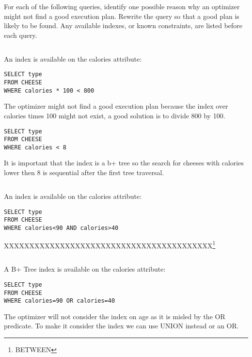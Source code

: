 {\color{gray} For each of the following queries, identify one possible reason why an optimizer might not find a good
execution plan. Rewrite the query so that a good plan is likely to be found. Any available indexes, or known
constraints, are listed before each query.}

{\color{gray}\subsection{} An index is available on the calories attribute:}

\begin{lstlisting}
SELECT type
FROM CHEESE
WHERE calories * 100 < 800
\end{lstlisting}

The optimizer might not find a good execution plan because the index over calories times 100 might not exist, a good solution is to divide 800 by 100.

\begin{lstlisting}
SELECT type
FROM CHEESE
WHERE calories < 8
\end{lstlisting}

It is important that the index is a b+ tree so the search for cheeses with calories lower then 8 is sequential after the first tree traversal.

{\color{gray}\subsection{} An index is available on the calories attribute:}

\begin{lstlisting}
SELECT type
FROM CHEESE
WHERE calories<90 AND calories>40
\end{lstlisting}

{\color{red}XXXXXXXXXXXXXXXXXXXXXXXXXXXXXXXXXXXXXXXXX}\footnote{BETWEEN}

{\color{gray}\subsection{} A B+ Tree index is available on the calories attribute:}

\begin{lstlisting}
SELECT type
FROM CHEESE
WHERE calories=90 OR calories=40
\end{lstlisting}

The  optimizer  will  not  consider  the  index  on  age  as  it  is  misled  by  the  OR predicate. To make it consider the index we can use UNION instead or an OR.

